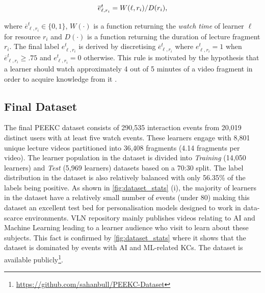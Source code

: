 \documentclass[letterpaper]{article} %
\begin{document}
\begin{equation} \label{eq:norm_engage}\centering
\overline{e}^t_{\ell,r_i} = W(\ell,r_i) / D(r_i),
\end{equation}

where $\overline{e}^t_{\ell,r_i} \in \{0,1\}$, $W(\cdot)$ is a function returning the \emph{watch time} of learner $\ell$ for resource $r_i$ and $D(\cdot)$ is a function returning the duration of lecture fragment $r_i$. The final label $e^t_{\ell,r_i}$ is derived by discretising $\overline{e}^t_{\ell,r_i}$ where $e^t_{\ell,r_i} = 1 $ when $\overline{e}^t_{\ell,r_i} \geq .75$ and $e^t_{\ell,r_i} = 0$ otherwise. This rule is motivated by the hypothesis that a learner should watch approximately 4 out of 5 minutes of a video fragment in order to acquire knowledge from it \cite{truelearn}.

\subsection{Final Dataset}

The final PEEKC dataset consists of 290,535 interaction events from 20,019 distinct users with at least five watch events. These learners engage with 8,801 unique lecture videos partitioned into 36,408 fragments (4.14 fragments per video). The learner population in the dataset is divided into \emph{Training} (14,050 learners) and \emph{Test} (5,969 learners) datasets based on a 70:30 split. The label distribution in the dataset is also relatively balanced with only 56.35\% of the labels being positive. As shown in \figurename{ \ref{fig:dataset_stats} (i)}, the majority of learners in the dataset have a relatively small number of events (under 80) making this dataset an excellent test bed for personalisation models designed to work in data-scarce environments. VLN repository mainly publishes videos relating to AI and Machine Learning leading to a learner audience who visit to learn about these subjects. This fact is confirmed by \figurename{ \ref{fig:dataset_stats}} where it shows that the dataset is dominated by events with AI and ML-related KCs. The dataset is available publicly\footnote{\url{https://github.com/sahanbull/PEEKC-Dataset}}.


\end{document}

